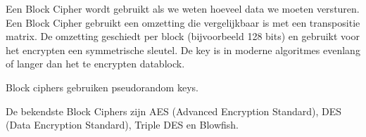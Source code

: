 Een Block Cipher wordt gebruikt als we weten hoeveel data we moeten versturen. Een Block Cipher gebruikt een omzetting die vergelijkbaar is met een transpositie matrix. De omzetting geschiedt per block (bijvoorbeeld 128 bits) en gebruikt voor het encrypten een symmetrische sleutel. De key is in moderne algoritmes evenlang of langer dan het te encrypten datablock.

Block ciphers gebruiken pseudorandom keys.

De bekendste Block Ciphers zijn AES (Advanced Encryption Standard), DES (Data Encryption Standard), Triple DES en Blowfish.

